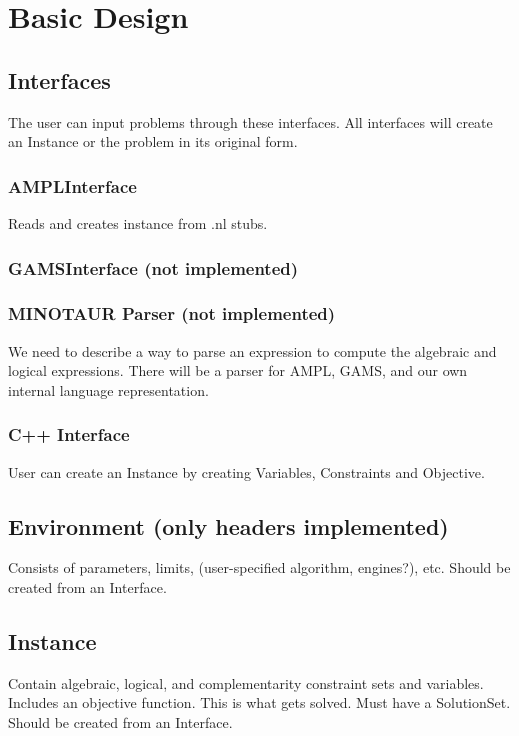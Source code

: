 \documentclass[10pt]{report}
\newcommand{\notimpl}[0]{(not implemented)}
\newcommand{\honly}[0]{(only headers implemented)}
\begin{document}


\chapter{Basic Design}

\section{Interfaces}
The user can input problems through these interfaces.
All interfaces will create an Instance or the problem in its original form.

\subsection{AMPLInterface}
Reads and creates instance from .nl stubs.
\subsection{GAMSInterface \notimpl}
\subsection{MINOTAUR Parser (not implemented)}
We need to describe a way to parse an expression to compute the algebraic
and logical expressions.  There will be a parser for AMPL, GAMS, and 
our own internal language representation.

\subsection{C++ Interface}
User can create an Instance by creating Variables, Constraints and
Objective.

\section{Environment \honly}
Consists of parameters, limits, (user-specified algorithm, engines?), etc.
Should be created from an Interface.

\section{Instance}
Contain algebraic, logical, and complementarity constraint sets and 
variables. Includes an objective function. This is what gets solved. Must have
a SolutionSet.  Should be created from an Interface.
\end{document}
